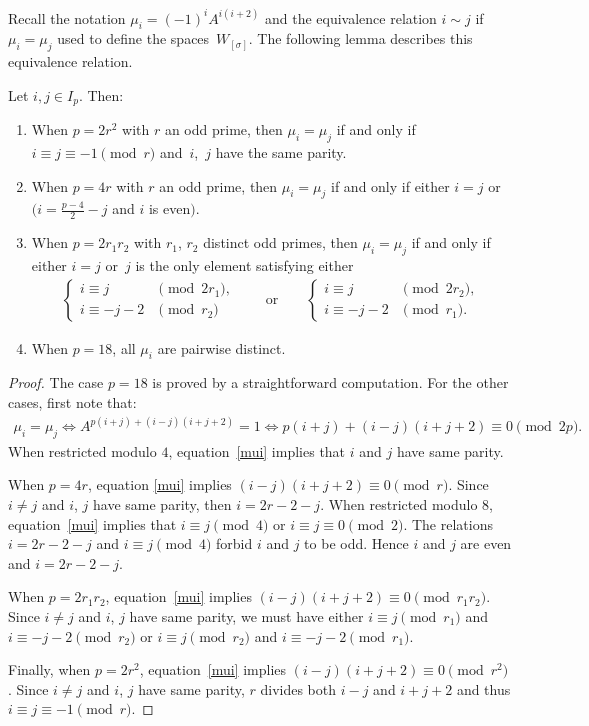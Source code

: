 Recall the notation $\mu_i=(-1)^iA^{i(i+2)}$ and the equivalence relation $i\sim j$ if $\mu_i=\mu_j$ used to define the spaces~$W_{[\sigma]}$. The following lemma describes this equivalence relation.
\begin{Lemma}\label{lemmachoucroute} Let $i,j\in I_p$. Then:
\begin{enumerate}\itemsep=0pt
\item[$1.$] When $p=2r^2$ with $r$ an odd prime, then $\mu_i=\mu_j$ if and only if $i\equiv j\equiv -1\pmod{r}$ and~$i$,~$j$ have the same parity.
\item[$2.$] When $p=4r$ with $r$ an odd prime, then $\mu_i=\mu_j$ if and only if either $i=j$ or $(i=\frac{p-4}{2} - j$ and $i$ is even$)$.
\item[$3.$] When $p=2r_1r_2$ with $r_1$, $r_2$ distinct odd primes, then $\mu_i=\mu_j$ if and only if either $i=j$ or~$j$ is the only element satisfying either
\begin{gather*} \begin{cases}
i\equiv j & \pmod{2r_1}, \\
i\equiv -j-2 & \pmod{r_2}
\end{cases}
\qquad \text{or}\qquad
 \begin{cases}
i\equiv j & \pmod{2r_2}, \\
i\equiv -j-2 & \pmod{r_1}.
\end{cases}
\end{gather*}
\item[$4.$] When $p=18$, all $\mu_i$ are pairwise distinct.
 \end{enumerate}
\end{Lemma}

\begin{proof}The case $p=18$ is proved by a straightforward computation. For the other cases, first note that:
\begin{gather}\label{mui}
 \mu_i=\mu_j \Leftrightarrow A^{p(i+j)+(i-j)(i+j+2)}=1 \Leftrightarrow p(i+j)+(i-j)(i+j+2)\equiv 0 \pmod{2p}.
\end{gather}
When restricted modulo $4$, equation~\eqref{mui} implies that $i$ and $j$ have same parity.

When $p=4r$, equation \eqref{mui} implies $(i-j)(i+j+2)\equiv 0 \pmod{r}$. Since $i\neq j$ and $i$, $j$ have same parity, then $i=2r-2-j$. When restricted modulo $8$, equation~\eqref{mui} implies that $i\equiv j\pmod{4}$ or $i\equiv j \equiv 0 \pmod{2}$. The relations $i=2r-2-j$ and $i\equiv j \pmod{4}$ forbid $i$ and $j$ to be odd. Hence $i$ and $j$ are even and $i=2r-2-j$.

When $p=2r_1r_2$, equation~\eqref{mui} implies $(i-j)(i+j+2) \equiv 0\pmod{r_1r_2}$. Since $i\neq j$ and $i$, $j$ have same parity, we must have either $i\equiv j \pmod{r_1}$ and $i\equiv -j-2 \pmod{r_2}$ or $i\equiv j \pmod{r_2}$ and $i\equiv -j-2 \pmod{r_1}$.

Finally, when $p=2r^2$, equation~\eqref{mui} implies $(i-j)(i+j+2) \equiv 0\pmod{r^2}$. Since $i\neq j$ and $i$, $j$ have same parity, $r$ divides both $i-j$ and $i+j+2$ and thus $i\equiv j \equiv -1 \pmod{r}$.
\end{proof}

